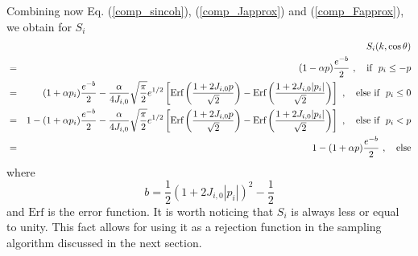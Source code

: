 Combining now Eq. (\ref{comp_sincoh}), (\ref{comp_Japprox}) and 
(\ref{comp_Fapprox}),  we obtain for $S_i$
\begin{eqnarray}
\label{comp_Si}
& & S_i(k,\cos \theta) \nonumber \\
& = & (1 - \alpha p) {e^{-b} \over 2}~,\quad \mbox{if}~~p_i \le -p \nonumber \\
& = &
(1 + \alpha p_i) {e^{-b} \over 2} - {\alpha \over 4 J_{i,0}} 
\sqrt{{\pi \over 2}} e^{1/2} \left[ \mbox{Erf} \left( 1 + 2 J_{i,0} p \over 
\sqrt{2} \right) - \mbox{Erf} \left(  1 + 2 J_{i,0} |p_i| 
\over \sqrt{2} \right) \right]~,\quad \mbox{else if}~~ p_i \le 0 \nonumber \\
& = & 
1 - (1 + \alpha p_i) {e^{-b} \over 2} - {\alpha \over 4 J_{i,0}} 
\sqrt{{\pi \over 2}} e^{1/2} \left[ \mbox{Erf} \left( 1 + 2 J_{i,0} p \over 
\sqrt{2} \right) - \mbox{Erf} \left(  1 + 2 J_{i,0} |p_i| 
\over \sqrt{2} \right) \right] ~,\quad \mbox{else if}~~ p_i < p \nonumber \\
& = &
1 - (1 + \alpha p) {e^{-b} \over 2} ~,\quad \mbox{else}
\end{eqnarray}
where
\begin{equation}
b = \frac{1}{2}\left(1 + 2 J_{i,0} |p_i| \right)^2 - \frac{1}{2}
\end{equation}
and $\mbox{Erf}$ is the error function. It is worth noticing that 
$S_i$ is always less or equal to unity. This fact allows for 
using it as a rejection function in the sampling algorithm discussed 
in the next section.

